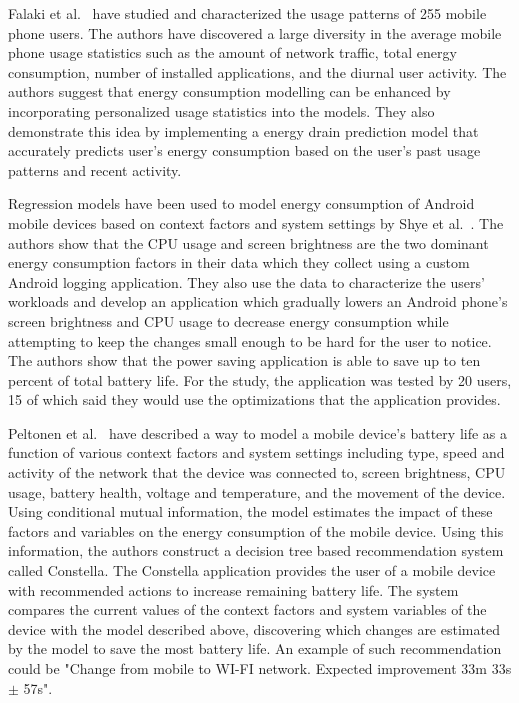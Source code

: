 Falaki et al.~\cite{Falaki:2010:DSU:1814433.1814453} have studied and characterized the usage patterns of 255 mobile phone users. The authors have discovered a large diversity in the average mobile phone usage statistics such as the amount of network traffic, total energy consumption, number of installed applications, and the diurnal user activity. The authors suggest that energy consumption modelling can be enhanced by incorporating personalized usage statistics into the models. They also demonstrate this idea by implementing a energy drain prediction model that accurately predicts user's energy consumption based on the user's past usage patterns and recent activity.          

Regression models have been used to model energy consumption of Android mobile devices based on context factors and system settings by Shye et al.~\cite{5375354}. The authors show that the CPU usage and screen brightness are the two dominant energy consumption factors in their data which they collect using a custom Android logging application. They also use the data to characterize the users' workloads and develop an application which gradually lowers an Android phone's screen brightness and CPU usage to decrease energy consumption while attempting to keep the changes small enough to be hard for the user to notice. The authors show that the power saving application is able to save up to ten percent of total battery life. For the study, the application was tested by 20 users, 15 of which said they would use the optimizations that the application provides.

Peltonen et al.~\cite{PELTONEN201671, 7146507} have described a way to model a mobile device's battery life as a function of various context factors and system settings including type, speed and activity of the network that the device was connected to, screen brightness, CPU usage, battery health, voltage and temperature, and the movement of the device. Using conditional mutual information, the model estimates the impact of these factors and variables on the energy consumption of the mobile device. Using this information, the authors construct a decision tree based recommendation system called Constella. The Constella application provides the user of a mobile device with recommended actions to increase remaining battery life. The system compares the current values of the context factors and system variables of the device with the model described above, discovering which changes are estimated by the model to save the most battery life. An example of such recommendation could be "Change from mobile to WI-FI network. Expected improvement 33m 33s $\pm$ 57s".    


